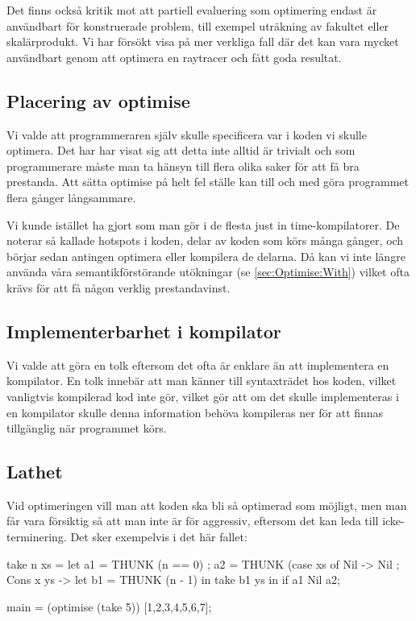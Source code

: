 \documentclass[Rapport]{subfiles}
\begin{document}
Det finns också kritik mot att partiell evaluering som optimering endast är användbart för konstruerade problem, till exempel uträkning av fakultet eller skalärprodukt. Vi har försökt visa på mer verkliga fall där det kan vara mycket användbart genom att optimera en raytracer och fått goda resultat. 


\subsection{Placering av optimise}

Vi valde att programmeraren själv skulle  specificera var i koden vi skulle optimera. Det har har visat sig att detta inte alltid är trivialt och som programmerare måste man ta hänsyn till flera olika saker för att få bra prestanda. Att sätta optimise på helt fel ställe kan till och med göra programmet flera gånger långsammare.

Vi kunde istället ha gjort som man gör i de flesta just in time-kompilatorer. De noterar så kallade hotspots i koden, delar av koden som körs många gånger, och börjar sedan antingen optimera eller kompilera de delarna. Då kan vi inte längre använda våra semantikförstörande utökningar (se \ref{sec:Optimise:With}) vilket ofta krävs för att få någon verklig prestandavinst. 






\subsection{Implementerbarhet i kompilator}
Vi valde att göra en tolk eftersom det ofta är enklare än att implementera en kompilator.
En tolk innebär att man känner till syntaxträdet hos koden, vilket vanligtvis kompilerad
kod inte gör, vilket gör att om det skulle implementeras i en kompilator skulle
denna information behöva kompileras ner för att finnas tillgänglig när programmet körs.


\subsection{Lathet}
Vid optimeringen vill man att koden ska bli så optimerad som möjligt, men man får
vara försiktig så att man inte är för aggressiv, 
eftersom det kan leda till icke-terminering. Det sker exempelvis i det här fallet:

\begin{codeEx}
take n xs = let
    { a1 = THUNK (n == 0)
    ; a2 = THUNK (case xs of
        { Nil -> Nil
        ; Cons x ys -> let
            { b1 = THUNK (n - 1)
            } in take b1 ys
        }
    } in if a1 Nil a2;

main = (optimise (take 5)) [1,2,3,4,5,6,7];
\end{codeEx}
\end{document}
